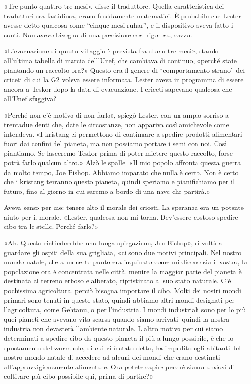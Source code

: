 «Tre punto quattro tre mesi», disse il traduttore. Quella caratteristica
dei traduttori era fastidiosa, erano freddamente matematici. È probabile
che Lester avesse detto qualcosa come ``cinque mesi ruhar'', e il
dispositivo aveva fatto i conti. Non avevo bisogno di una precisione
così rigorosa, cazzo.

«L'evacuazione di questo villaggio è prevista fra due o tre mesi»,
stando all'ultima tabella di marcia dell'Unef, che cambiava di continuo,
«perché state piantando un raccolto ora?» Questo era il genere di
``comportamento strano'' dei criceti di cui la G2 voleva essere
informata. Lester aveva in programma di essere ancora a Teskor dopo la
data di evacuazione. I criceti sapevano qualcosa che all'Unef sfuggiva?

«Perché non c'è motivo di non farlo», spiegò Lester, con un ampio
sorriso a trentadue denti che, date le circostanze, non appariva così
amichevole come intendeva. «I kristang ci permettono di continuare a
spedire prodotti alimentari fuori dai confini del pianeta, ma non
possiamo portare i semi con noi. Così piantiamo. Se lasceremo Teskor
prima di poter mietere questo raccolto, forse potrà farlo qualcun
altro.» Alzò le spalle. «Il mio popolo affronta questa guerra da molto
tempo, Joe Bishop. Abbiamo imparato che nulla è certo. Non è certo che i
kristang terranno questo pianeta, quindi speriamo e pianifichiamo per il
futuro, fino al giorno in cui saremo a bordo di una nave che partirà.»

Aveva senso per me: tenere alto il morale dei criceti. La speranza era
un potente aiuto per il morale. «Lester, qualcosa non mi torna.
Dev'essere costoso spedire cibo tra le stelle. Perché farlo?»

«Ah. Questo richiederebbe una lunga spiegazione, Joe Bishop», si voltò a
guardare gli ospiti della sua grigliata, «ci sono due motivi principali.
Nel nostro mondo natale, che a un certo punto era inquinato come mi
dicono sia il vostro, la popolazione ora è concentrata nelle città,
mentre la maggior parte del pianeta è destinata al terreno erboso e
alberato, ripristinato al suo stato naturale. C'è pochissima
agricoltura, perciò bisogna importare il cibo. Molti dei nostri mondi
primari sono tenuti in questo stato, quindi abbiamo altri mondi
designati per l'agricoltura, come Gehtanu, o per l'industria. I mondi
industriali sono per lo più quei pianeti che avevano vita scarsa quando
siamo arrivati, quindi la nostra industria non devasterà l'ambiente
naturale. L'altro motivo per cui siamo determinati a spedire cibo da
questo pianeta il più a lungo possibile, è che lo spostamento del
wormhole, di cui vi è stato detto, ha impedito agli abitanti del nostro
mondo natale di accedere ad alcuni dei mondi che erano destinati
all'approvvigionamento alimentare. Ora potete capire perché siamo
ansiosi di coltivare più cibo possibile qui, prima di partire?»

